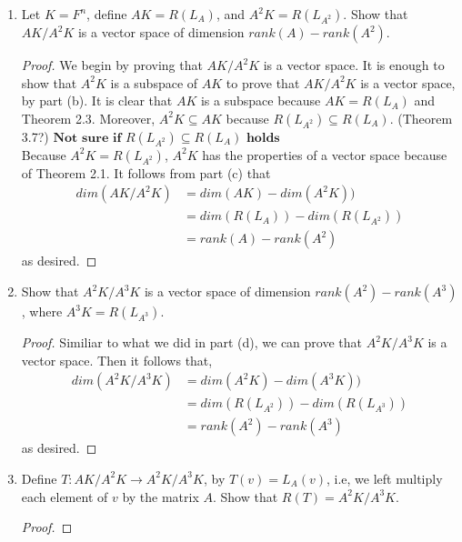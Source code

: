 \documentclass[11pt]{scrartcl}
\begin{document}
\begin{enumerate}[label=\alph*.]
	\item{
	      Let $K = F^n$, define $AK = R(L_A)$, and $A^2K = R(L_{A^2})$.
	      Show that $AK/A^2K$ is a vector space of dimension $rank(A) - rank(A^2)$.
	      \begin{proof}
		      We begin by proving that $AK/A^2K$ is a vector space. It is enough to show that $A^2K$ is a subspace of $AK$
		      to prove that $AK/A^2K$ is a vector space, by part (b). It is clear that $AK$ is a subspace because $AK = R(L_A)$
		      and Theorem 2.3. Moreover, $A^2K \subseteq AK$ because $R(L_{A^2}) \subseteq R(L_A)$. (Theorem 3.7?)
		      $\textbf{Not sure if }  $$R(L_{A^2}) \subseteq R(L_A)$$ \textbf{ holds }$ \\
		      Because $A^2K = R(L_{A^2})$, $A^2K$ has the properties of a vector space because of Theorem 2.1.
		      It follows from part (c) that
		      \begin{align*}
			      dim(AK/A^2K) & = dim(AK) - dim(A^2K))          \\
			                   & = dim(R(L_A)) - dim(R(L_{A^2})) \\
			                   & = rank(A) - rank(A^2)
		      \end{align*}
		      as desired.
	      \end{proof}
	      }
	\item{
	      Show that $A^2K/A^3K$ is a vector space of dimension $rank(A^2) - rank(A^3)$, where $A^3K= R(L_{A^3})$.
	      \begin{proof}
		      Similiar to what we did in part (d), we can prove that $A^2K/A^3K$ is a vector space.
		      Then it follows that,
		      \begin{align*}
			      dim(A^2K/A^3K) & = dim(A^2K) - dim(A^3K))            \\
			                     & = dim(R(L_{A^2})) - dim(R(L_{A^3})) \\
			                     & = rank(A^2) - rank(A^3)
		      \end{align*}
		      as desired.
	      \end{proof}
	      }
	\item{
	      Define $T: AK/A^2K \rightarrow A^2K/A^3K$, by $T(v) = L_A(v)$, i.e, we left multiply each element of $v$ by the matrix $A$.
	      Show that $R(T) = A^2K/A^3K$.
	      \begin{proof}


\end{proof}}
\end{enumerate}
\end{document}
